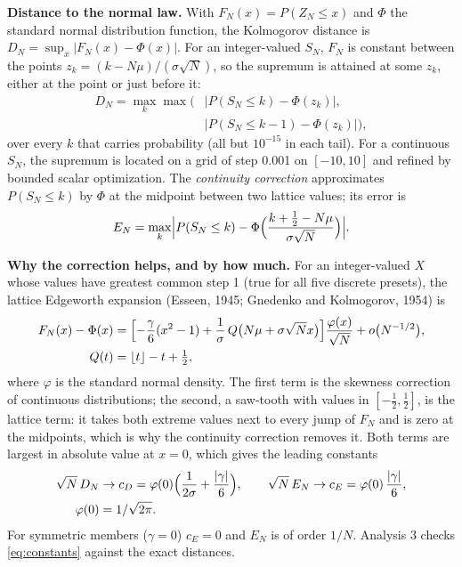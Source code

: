 \documentclass[11pt,a4paper]{article}
\begin{document}
\textbf{Distance to the normal law.} With $F_N(x) = P(Z_N \le x)$ and $\Phi$ the standard normal distribution function, the
Kolmogorov distance is $D_N = \sup_x |F_N(x) - \Phi(x)|$. For an integer-valued $S_N$, $F_N$ is constant between the points
$z_k = (k - N\mu)/(\sigma\sqrt N)$, so the supremum is attained at some $z_k$, either at the point or just before it:
\begin{equation}
\begin{split}
D_N = \max_k \max\bigl(&|P(S_N \le k) - \Phi(z_k)|,\\
&|P(S_N \le k-1) - \Phi(z_k)|\bigr),
\end{split}
\label{eq:dlattice}
\end{equation}
over every $k$ that carries probability (all but $10^{-15}$ in each tail). For a continuous $S_N$, the supremum is located on a grid
of step 0.001 on $[-10, 10]$ and refined by bounded scalar optimization. The \emph{continuity correction} approximates
$P(S_N \le k)$ by $\Phi$ at the midpoint between two lattice values; its error is
\begin{equation}
E_N = \max_k \Bigl|P(S_N \le k) - \Phi\Bigl(\frac{k + \tfrac12 - N\mu}{\sigma\sqrt N}\Bigr)\Bigr|. \label{eq:corrected}
\end{equation}

\textbf{Why the correction helps, and by how much.} For an integer-valued $X$ whose values have greatest common step 1 (true for all
five discrete presets), the lattice Edgeworth expansion (Esseen, 1945; Gnedenko and Kolmogorov, 1954) is
\begin{equation}
\begin{split}
F_N(x) - \Phi(x) &= \Bigl[-\frac{\gamma}{6}(x^2 - 1) + \frac{1}{\sigma}\, Q\bigl(N\mu + \sigma\sqrt N x\bigr)\Bigr]\frac{\varphi(x)}{\sqrt N}
+ o\bigl(N^{-1/2}\bigr),\\
Q(t) &= \lfloor t \rfloor - t + \tfrac12 ,
\end{split}
\label{eq:edgeworth}
\end{equation}
where $\varphi$ is the standard normal density. The first term is the skewness correction of continuous distributions; the second,
a saw-tooth with values in $[-\tfrac12, \tfrac12]$, is the lattice term: it takes both extreme values next to every jump of $F_N$
and is zero at the midpoints, which is why the continuity correction removes it. Both terms are largest in absolute value at
$x = 0$, which gives the leading constants
\begin{equation}
\begin{split}
\sqrt N\, D_N &\to c_D = \varphi(0)\Bigl(\frac{1}{2\sigma} + \frac{|\gamma|}{6}\Bigr), \qquad
\sqrt N\, E_N \to c_E = \varphi(0)\,\frac{|\gamma|}{6},\\
\varphi(0) &= 1/\sqrt{2\pi}.
\end{split}
\label{eq:constants}
\end{equation}
For symmetric members ($\gamma = 0$) $c_E = 0$ and $E_N$ is of order $1/N$. Analysis 3 checks \eqref{eq:constants} against the
exact distances.
\end{document}

